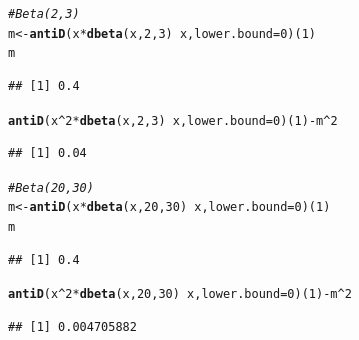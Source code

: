 \documentclass[twoside]{book}\usepackage[]{graphicx}\usepackage[]{xcolor}
\makeatletter
\newcommand{\hlnum}[1]{\textcolor[rgb]{0.686,0.059,0.569}{#1}}%
\newcommand{\hlcom}[1]{\textcolor[rgb]{0.678,0.584,0.686}{\textit{#1}}}%
\newcommand{\hlopt}[1]{\textcolor[rgb]{0,0,0}{#1}}%
\newcommand{\hlstd}[1]{\textcolor[rgb]{0.345,0.345,0.345}{#1}}%
\newcommand{\hlkwb}[1]{\textcolor[rgb]{0.69,0.353,0.396}{#1}}%
\newcommand{\hlkwc}[1]{\textcolor[rgb]{0.333,0.667,0.333}{#1}}%
\newcommand{\hlkwd}[1]{\textcolor[rgb]{0.737,0.353,0.396}{\textbf{#1}}}%
\newenvironment{kframe}{%
 \def\at@end@of@kframe{}%
 \ifinner\ifhmode%
  \def\at@end@of@kframe{\end{minipage}}%
  \begin{minipage}{\columnwidth}%
 \fi\fi%
 \def\FrameCommand##1{\hskip\@totalleftmargin \hskip-\fboxsep
 \colorbox{shadecolor}{##1}\hskip-\fboxsep
     \hskip-\linewidth \hskip-\@totalleftmargin \hskip\columnwidth}%
 \MakeFramed {\advance\hsize-\width
   \@totalleftmargin\z@ \linewidth\hsize
   \@setminipage}}%
 {\par\unskip\endMakeFramed%
 \at@end@of@kframe}
\newenvironment{knitrout}{}{} %
\makeatother
\begin{document}
\begin{solution}
\begin{knitrout}
\color{fgcolor}\begin{kframe}
\begin{alltt}
\hlcom{# Beta(2,3)}
\hlstd{m} \hlkwb{<-} \hlkwd{antiD}\hlstd{(x} \hlopt{*} \hlkwd{dbeta}\hlstd{(x,} \hlnum{2}\hlstd{,} \hlnum{3}\hlstd{)} \hlopt{~} \hlstd{x,} \hlkwc{lower.bound} \hlstd{=} \hlnum{0}\hlstd{)(}\hlnum{1}\hlstd{)}
\hlstd{m}
\end{alltt}
\begin{verbatim}
## [1] 0.4
\end{verbatim}
\begin{alltt}
\hlkwd{antiD}\hlstd{(x}\hlopt{^}\hlnum{2} \hlopt{*} \hlkwd{dbeta}\hlstd{(x,} \hlnum{2}\hlstd{,} \hlnum{3}\hlstd{)} \hlopt{~} \hlstd{x,} \hlkwc{lower.bound} \hlstd{=} \hlnum{0}\hlstd{)(}\hlnum{1}\hlstd{)} \hlopt{-} \hlstd{m}\hlopt{^}\hlnum{2}
\end{alltt}
\begin{verbatim}
## [1] 0.04
\end{verbatim}
\end{kframe}
\end{knitrout}
\begin{knitrout}
\color{fgcolor}\begin{kframe}
\begin{alltt}
\hlcom{# Beta(20,30)}
\hlstd{m} \hlkwb{<-} \hlkwd{antiD}\hlstd{(x} \hlopt{*} \hlkwd{dbeta}\hlstd{(x,} \hlnum{20}\hlstd{,} \hlnum{30}\hlstd{)} \hlopt{~} \hlstd{x,} \hlkwc{lower.bound} \hlstd{=} \hlnum{0}\hlstd{)(}\hlnum{1}\hlstd{)}
\hlstd{m}
\end{alltt}
\begin{verbatim}
## [1] 0.4
\end{verbatim}
\begin{alltt}
\hlkwd{antiD}\hlstd{(x}\hlopt{^}\hlnum{2} \hlopt{*} \hlkwd{dbeta}\hlstd{(x,} \hlnum{20}\hlstd{,} \hlnum{30}\hlstd{)} \hlopt{~} \hlstd{x,} \hlkwc{lower.bound} \hlstd{=} \hlnum{0}\hlstd{)(}\hlnum{1}\hlstd{)} \hlopt{-} \hlstd{m}\hlopt{^}\hlnum{2}
\end{alltt}
\begin{verbatim}
## [1] 0.004705882
\end{verbatim}
\end{kframe}
\end{knitrout}
\begin{knitrout}
\color{fgcolor}\begin{kframe}

\end{kframe}
\end{knitrout}
\end{solution}
\end{document}
